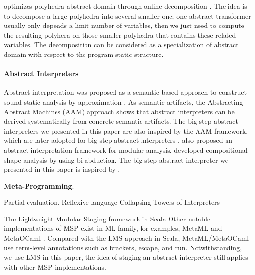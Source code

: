 \citeauthor{DBLP:conf/popl/SinghPV17} optimizes polyhedra abstract domain through online decomposition \cite{DBLP:conf/popl/SinghPV17, Singh:2017:PCD:3177123.3158143}.
The idea is to decompose a large polyhedra into several smaller one; one abstract transformer
usually only depends a limit number of variables, then we just need to compute the resulting polyhera
on those smaller polyhedra that contains these related variables.
The decomposition can be considered as a specialization of abstract domain with respect to the program
static structure.

\paragraph{Abstract Interpreters}
Abstract interpretation was proposed as a semantic-based approach to construct sound static analysis by approximation \cite{DBLP:conf/popl/CousotC77}.
As semantic artifacts, the Abstracting Abstract Machines (AAM) \cite{DBLP:journals/jfp/HornM12, DBLP:conf/icfp/HornM10}
approach shows that abstract interpreters can be derived systematically from concrete semantic artifacts.
The big-step abstract interpreters we presented in this paper are also inspired by the AAM framework,
which are later adopted for big-step abstract interpreters \cite{DBLP:journals/pacmpl/DaraisLNH17, Wei:2018:RAA:3243631.3236800}.
\citet{DBLP:conf/cc/CousotC02} also proposed an abstract interpretation framework for modular analysis.
\citet{DBLP:conf/popl/CalcagnoDOY09} developed compositional shape analysis by using bi-abduction.
The big-step abstract interpreter we presented in this paper is inspired by \cite{DBLP:journals/pacmpl/DaraisLNH17, Wei:2018:RAA:3243631.3236800}.

\textbf{Meta-Programming}.

Partial evaluation. 
Reflexive language \cite{DBLP:conf/gpce/Asai14}
Collapsing Towers of Interpreters \cite{Amin:2017:CTI:3177123.3158140}

The Lightweight Modular Staging framework in Scala
Other notable implementations of MSP exist in ML family, for examples, MetaML \cite{DBLP:conf/pepm/TahaS97} 
and MetaOCaml \cite{DBLP:conf/gpce/CalcagnoTHL03, DBLP:conf/flops/Kiselyov14}.
Compared with the LMS approach in Scala, MetaML/MetaOCaml use term-level annotations such as brackets, 
escape, and run. Notwithstanding, we use LMS in this paper, the idea of staging an abstract interpreter
still applies with other MSP implementations.

